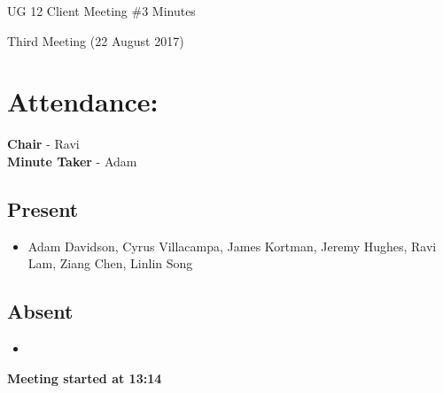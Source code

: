 \documentclass{article}
\begin{document}
\begin{adjustwidth}{2.5em}{0pt}
\begin{center}
\Large{UG 12 Client Meeting \#3  Minutes}\\
\end{center}
\end{adjustwidth}

Third Meeting (22 August 2017)
\section{Attendance:}
\textbf{Chair} - Ravi\\
\textbf{Minute Taker} - Adam\\
\subsection*{Present}
\begin{itemize}
\item Adam Davidson, Cyrus Villacampa, James Kortman, Jeremy Hughes, Ravi Lam, Ziang Chen, Linlin Song
\end{itemize}
\subsection*{Absent}
\begin{itemize}
\item  
\end {itemize}
\textbf{Meeting started at 13:14}
\end{document}
